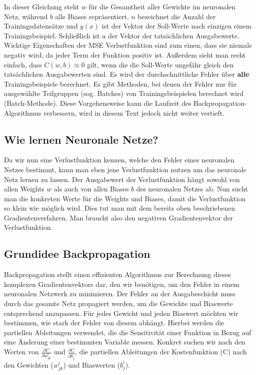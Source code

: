 \noindent
In dieser Gleichung steht $w$ für die Gesamtheit aller Gewichte im neuronalen Netz, während $b$ alle Biases repräsentiert.
$n$ bezeichnet die Anzahl der Trainingsdatensätze und $y(x)$ ist der Vektor der Soll-Werte nach einzigen einem Trainingsbeispiel.
Schließlich ist $a$ der Vektor der tatsächlichen Ausgabewerte. 
\bigbreak\noindent
Wichtige Eigenschaften der MSE Verlustfunktion sind zum einen, dass sie niemals negativ wird, da jeder Term der Funktion positiv ist.
Außerdem sieht man recht einfach, dass $C(w, b) \approx 0$ gilt, wenn die die Soll-Werte ungefähr gleich den tatsächlichen Ausgabewerten sind.
\bigbreak\noindent
Es wird der durchschnittliche Fehler über \textbf{alle} Trainingsbeispiele berechnet. 
Es gibt Methoden, bei denen der Fehler nur für ausgewählte Teilgruppen (sog. Batches) von Trainingsbeispielen berechnet wird (Batch-Methode). 
Diese Vorgehensweise kann die Laufzeit des Backpropagation-Algorithmus verbessern, wird in diesem Text jedoch nicht weiter vertieft.

\subsection{Wie lernen Neuronale Netze?}\label{subsec:backpropagation:lernen_nn}
Da wir nun eine Verlustfunktion kennen, welche den Fehler eines neuronalen Netzes bestimmt, kann man eben jene
Verlustfunktion nutzen um das neuronale Netz lernen zu lassen. Der Ausgabewert der Verlustfunktion hängt sowohl von allen Weights $w$ 
als auch von allen Biases $b$ des neuronalen Netzes ab. Nun sucht man die konkreten Werte für die Weights und Biases, damit die 
Verlustfunktion so klein wie möglich wird. Dies tut man mit dem bereits oben beschriebenen Gradientenverfahren. Man braucht also den 
negativen Gradientenvektor der Verlustfunktion.

\subsection{Grundidee Backpropagation}\label{subsec:backpropagation:grundiee}
Backpropagation stellt einen effizienten Algorithmus zur Berechnung dieses komplexen Gradientenvektors dar, den wir benötigen, um den Fehler in einem neuronalen Netzwerk zu minimieren.
Der Fehler an der Ausgabeschicht muss durch das gesamte Netz propagiert werden, um die Gewichte und Biaswerte entsprechend anzupassen.
Für jedes Gewicht und jeden Biaswert möchten wir bestimmen, wie stark der Fehler von diesem abhängt. 
Hierbei werden die partiellen Ableitungen verwendet, die die Sensitivität einer Funktion in Bezug auf eine Änderung einer bestimmten Variable messen.
Konkret suchen wir nach den Werten von $\frac{\partial C}{\partial w_{jk}^{l}}$ und $\frac{\partial C}{\partial b_{j}^{l}}$, die partiellen Ableitungen der Kostenfunktion (C) nach den Gewichten ($w_{jk}^{l}$) und Biaswerten ($b_{j}^{l}$).

